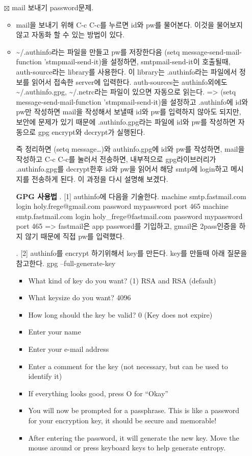 \documentclass[11pt]{article}
\begin{document}
\begin{itemize}
\item[{$\boxtimes$}] mail 보내기 password문제.
\begin{itemize}
\item mail을 보내기 위해 C-c C-c를 누르면 id와 pw를 물어본다. 이것을 물어보지 않고 자동화 할 수 있는 방법이 있다.
\item \textasciitilde{}/.authinfo라는 파일을 만들고 pw를 저장한다음 (setq message-send-mail-function 'stmpmail-send-it)을 설정하면, smtpmail-send-it이 호출될때, auth-source라는 library를 사용한다. 이  library는 .authinfo라는 파일에서 정보를 읽어서 접속한 server에 입력한다. auth-sources는 authinfo외에도  \textasciitilde{}/.authinfo.gpg, \textasciitilde{}/.netrc라는 파일이 있으면 자동으로 읽는다.
=> (setq message-send-mail-function 'stmpmail-send-it)을 설정하고 .authinfo에 id와 pw만 작성하면 mail을 작성해서 보낼때 id와 pw를 입력하지 않아도 되지만, 보안에 문제가 있기 때문에 .authinfo.gpg라는 파일에 id와 pw를 작성하면 자동으로 gpg encrypt와 decrypt가 실행된다.

즉 정리하면 (setq message\ldots{})와 authinfo.gpg에 id와 pw를 작성하면, mail을 작성하고 C-c  C-c를 눌러서 전송하면, 내부적으로 gpg라이브러리가 .authinfo.gpg를 decrypt한후 id와 pw을 읽어서 해당 smtp에 login하고 메시지를 전송하게 된다. 이 과정을 다시 설명해 보겠다.

\textbf{GPG 사용법}
. [1] authinfo에 다음을 기술한다.
machine smtp.fastmail.com login holy.frege@gmail.com password mypassword port 465
machine smtp.fastmail.com login holy\_frege@fastmail.com password mypassword port 465
=> fastmail은 app password를 기입하고, gmail은 2pass인증을 하지 않기 때문에 직접 pw를 입력했다.

. [2] authinfo를 encrypt 하기위해서 key를 만든다. key를 만들때 아래 질문을 참고한다.
   gpg --full-generate-key 

\begin{itemize}
\item What kind of key do you want? (1) RSA and RSA (default)
\item What keysize do you want? 4096
\item How long should the key be valid? 0 (Key does not expire)
\item Enter your name
\item Enter your e-mail address
\item Enter a comment for the key (not necessary, but can be used to identify it)
\item If everything looks good, press O for “Okay”
\item You will now be prompted for a passphrase. This is like a password for your encryption key, it should be secure and memorable!
\item After entering the password, it will generate the new key. Move the mouse around or press keyboard keys to help generate entropy.


\end{itemize}
\end{itemize}
\end{itemize}
\end{document}
